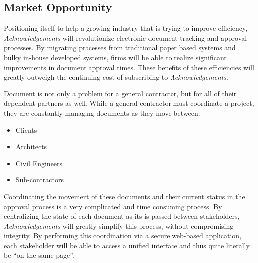 \subsection{Market Opportunity}
Positioning itself to help a growing industry that is trying to improve efficiency, {\it Acknowledgements} will revolutionize electronic document tracking and approval processes. By migrating processes from traditional paper based systems and bulky in-house developed systems, firms will be able to realize significant improvements in document approval times. These benefits of these efficiencies will greatly outweigh the continuing cost of subscribing to {\it Acknowledgements}.

Document is not only a problem for a general contractor, but for all of their dependent partners as well. While a general contractor must coordinate a project, they are constantly managing documents as they move between:

\begin{itemize}
	\item Clients
	\item Architects
	\item Civil Engineers
	\item Sub-contractors
\end{itemize}

Coordinating the movement of these documents and their current status in the approval process is a very complicated and time consuming process. By centralizing the state of each document as its is passed between stakeholders, {\it Acknowledgements} will greatly simplify this process, without compromising integrity. By performing this coordination via a secure web-based application, each stakeholder will be able to access a unified interface and thus quite literally be ``on the same page''.
